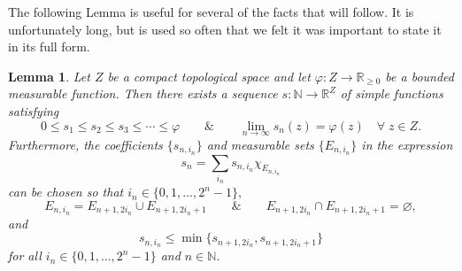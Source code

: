 \documentclass[12pt]{article}
\theoremstyle{theorem}
\newtheorem{lemma}[equation]{Lemma}
\theoremstyle{definition}
\numberwithin{equation}{section}
\def\vf{\varphi}
\newcommand{\be}{\begin{equation}}
\newcommand{\ee}{\end{equation}}
\newcommand{\blem}{\begin{lemma}}
\newcommand{\elem}{\end{lemma}}
\newcommand{\<}{\langle}
\renewcommand{\>}{\rangle}
\newcommand{\aand}{\qquad \& \qquad}
\def\R{{{\mathbb R}}}
\def\N{{{\mathbb N}}}
\begin{document}
The following Lemma is useful for several of the facts that will follow.
It is unfortunately long, but is used so often that we felt it was important
to state it in its full form. 

\blem
\label{lem:contcompactsequenceapprox}
Let $Z$ be a compact topological space and let $\vf:Z\to\R_{\ge0}$ be
a bounded measurable function. 
Then there exists a sequence $s:\N\to \R^{Z}$ 
of simple functions satisfying
\be
0\le s_1\le s_2\le s_3\le \cdots\le \vf
\aand
\lim_{n\to\infty}s_{n}(z)=\vf(z)\quad\forall\;z\in Z. 
\ee
Furthermore,
the coefficients $\{s_{n,i_n}\}$ and measurable sets $\{E_{n,i_{n}}\}$
in the expression 
\be
s_{n}=\sum_{i_{n}}s_{n,i_{n}}\chi_{E_{n,i_n}}
\ee
can be chosen so that 
$i_{n}\in\{0,1,\dots,2^{n}-1\},$ 
\be
\label{eq:splittingEtotwoparts}
E_{n,i_{n}}=E_{n+1,2i_{n}}\cup E_{n+1,2i_{n}+1}
\aand
E_{n+1,2i_{n}}\cap E_{n+1,2i_{n}+1}=\varnothing, 
\ee
and 
\be
\label{eq:breakingsimpleintotwo}
s_{n,i_{n}}\le\min\big\{s_{n+1,2i_{n}},s_{n+1,2i_{n}+1}\big\}
\ee
for all $i_{n}\in\{0,1,\dots,2^{n}-1\}$ and $n\in\N.$ 
\elem
\end{document}
